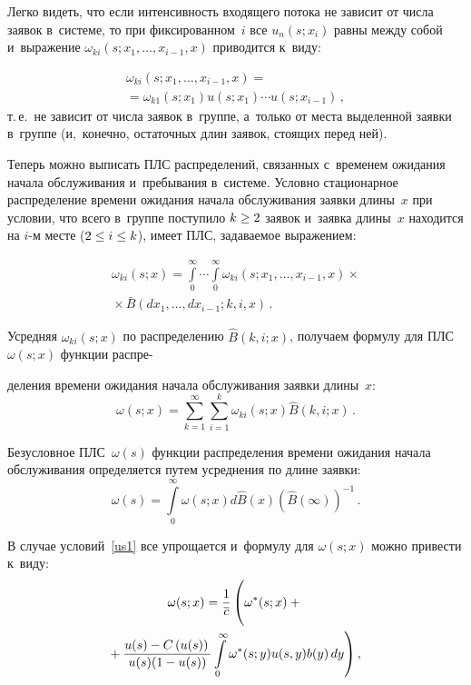 \begin{multicols}{2}
\noindent
Легко видеть, что если
интенсивность входящего потока не зависит от числа заявок в~системе,
то при фиксированном~$i$ все $u_n(s;x_i)$ равны между собой
и~выражение $\omega_{ki}(s;x_1, \dots, x_{i-1},x)$ приводится к~виду:

\noindent
\begin{multline*}
\omega_{ki}(s;x_1, \dots, x_{i-1},x)={}\\
{}=
\omega_{k1}(s;x_1)u(s;x_1)\cdots u(s;x_{i-1})\,,
\end{multline*}
т.\,е.\ не зависит от числа заявок в~группе, а~только от места выделенной
заявки в~группе (и,~конечно, остаточных длин заявок, стоящих перед ней).

Теперь можно выписать ПЛС распределений,
связанных с~временем ожидания начала обслуживания и~пребывания в~системе.
Условно стационарное распределение времени ожидания
начала обслуживания заявки длины~$x$
при условии, что всего в~группе поступило $k\hm\ge2$ заявок
и~заявка длины~$x$ находится на $i$-м месте ($2 \hm\le i \hm\le k$),
имеет ПЛС, задаваемое выражением:

\noindent
\begin{multline}
\omega_{ki}(s;x)
=
\int\limits_0^\infty\!\cdots\!\int\limits_0^\infty
\omega_{ki}\left(s;x_1, \dots, x_{i-1},x\right)\times{}\\
{}\times
{\bar B}\left(dx_1,\dots,dx_{i-1};k,i,x\right)\,.
\label{w1}
\end{multline}

\noindent
Усредняя $\omega_{ki}(s;x)$ по распределению
${\hat B}(k,i;x)$, получаем формулу для ПЛС
$\omega(s;x)$ функции распре-\linebreak\vspace*{-12pt}

\pagebreak

\noindent
деления времени
ожидания начала обслуживания
заявки длины~$x$:
\begin{equation}
\label{w2}
\omega(s;x)
= \sum\limits_{k=1}^\infty \sum\limits_{i=1}^k \omega_{ki}(s;x) {\hat B}(k,i;x)\,.
\end{equation}


\noindent
Безусловное ПЛС~$\omega(s)$ функции распределения времени
ожидания начала обслуживания определяется путем усреднения по длине заявки:
\begin{equation}
\label{w3}
\omega(s)= \int\limits_0^\infty
\omega(s;x) d{\hat B}(x) ({\hat B}(\infty))^{-1}\,.
\end{equation}

\noindent В случае условий~\eqref{us1} все упрощается
и~формулу для $\omega(s;x)$ можно привести к~виду:
\begin{multline}
\omega(s;x)
= \fr{1}{\overline{c}}
\left (
\vphantom{\int\limits_{0}^\infty}
\omega^*(s;x) + {}\right.\\
\hspace*{-2mm}\left.{}+\fr{u(s)-C \left ( u(s) \right )}{u(s) (1- u(s))}
\int\limits_{0}^\infty \omega^*(s;y) u(s,y) b(y)\, dy \right ),\!
\label{sc1}
\end{multline}


\end{multicols}
